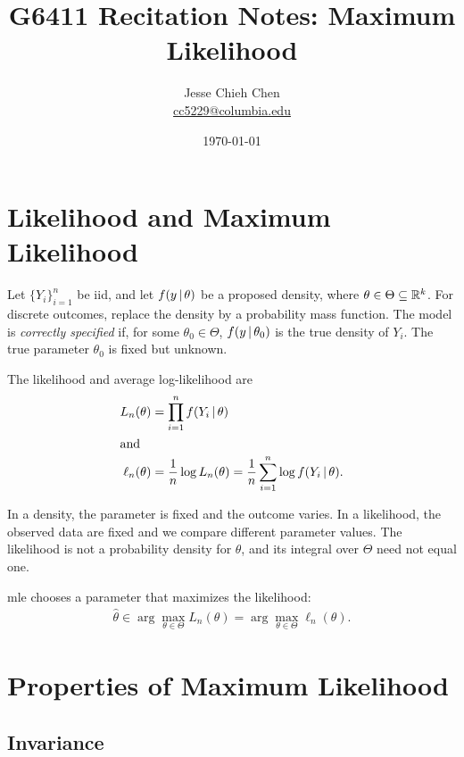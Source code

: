 \documentclass[a4paper,12pt]{article}
\title{G6411 Recitation Notes: Maximum Likelihood}
\author{Jesse Chieh Chen\\\href{mailto:cc5229@columbia.edu}{cc5229@columbia.edu}}
\date{\today}
\begin{document}
\maketitle

\section{Likelihood and Maximum Likelihood}

Let $\{Y_i\}_{i=1}^n$ be \gls{iid},
and let $f(y\mathpunct{}|\mathpunct{}\theta)$ be a proposed density,
where $\theta\in\Theta\subseteq\mathbb{R}^k$.
For discrete outcomes, replace the density by a probability mass function.
The model is \emph{correctly specified} if, for some $\theta_0\in\Theta$,
$f(y\mathpunct{}|\mathpunct{}\theta_0)$ is the true density of $Y_i$.
The true parameter $\theta_0$ is fixed but unknown.

\begin{definition}
	The likelihood and average log-likelihood are
	\begin{align}
		L_n(\theta)
		&= \prod_{i=1}^nf(Y_i\mathpunct{}|\mathpunct{}\theta) \\
		\shortintertext{and}
		\ell_n(\theta)
		&= \frac1n \log L_n(\theta)
		=\frac1n \sum_{i=1}^n\log f(Y_i\mathpunct{}|\mathpunct{}\theta).
	\end{align}
\end{definition}

\begin{remark}
	In a density, the parameter is fixed and the outcome varies.
	In a likelihood, the observed data are fixed and we compare different parameter values.
	The likelihood is not a probability density for $\theta$,
	and its integral over $\Theta$ need not equal one.
\end{remark}

\begin{definition}
	\Gls{mle} chooses a parameter that maximizes the likelihood:
	\begin{align}\label{eq-mle}
		\widehat\theta\in\arg\max_{\theta\in\Theta}L_n(\theta)
		=\arg\max_{\theta\in\Theta}\ell_n(\theta).
	\end{align}
\end{definition}

\section{Properties of Maximum Likelihood}

\subsection{Invariance}
\end{document}
